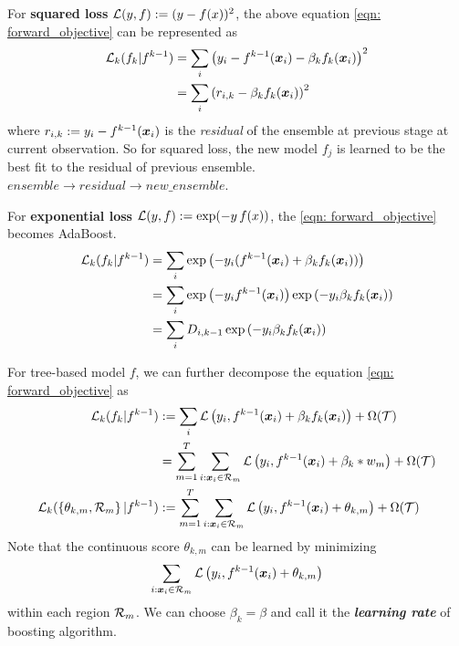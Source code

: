 \documentclass[11pt]{article}
\begin{document}
For \textbf{squared loss} ${\mathcal L}(y,f) := (y-f(x))^2$, the above equation \eqref{eqn: forward_objective} can be represented as 
\begin{align*}
{\mathcal L}_{k}(f_{k} | f^{k-1}) &= \sum_{i}\left(y_i - f^{k-1}(\boldsymbol{x}_{i}) - \beta_{k} f_{k}(\boldsymbol{x}_{i})\right)^2 \\
&=  \sum_{i}\left(r_{i,k} - \beta_{k} f_{k}(\boldsymbol{x}_{i})\right)^2 
\end{align*} where $r_{i,k}:= y_i - f^{k-1}(\boldsymbol{x}_{i})$ is the \emph{residual} of the ensemble at previous stage at current observation. So for squared loss, the new model $f_{j}$ is learned to be the best fit to the residual of previous ensemble. $ensemble \rightarrow residual \rightarrow new\_ensemble$.

For \textbf{exponential loss} ${\mathcal L}(y,f) := \exp(-y\,f(x))$, the \eqref{eqn: forward_objective} becomes AdaBoost. 
\begin{align*}
{\mathcal L}_{k}(f_{k} | f^{k-1}) &= \sum_{i}\exp\left(-y_i (f^{k-1}(\boldsymbol{x}_{i}) + \beta_{k} f_{k}(\boldsymbol{x}_{i}))\right) \\
&=  \sum_{i}\exp\left(-y_i f^{k-1}(\boldsymbol{x}_{i})\right) \exp\left( -y_{i}\beta_{k} f_{k}(\boldsymbol{x}_{i})\right) \\
&=  \sum_{i}D_{i,k-1} \exp\left( -y_{i}\beta_{k} f_{k}(\boldsymbol{x}_{i})\right)
\end{align*}

For tree-based model $f$, we can further decompose the equation \eqref{eqn: forward_objective} as 
\begin{align}
{\mathcal L}_{k}(f_{k} | f^{k-1}) &:=  \sum_{i}{\mathcal L}\left(y_i, f^{k-1}(\boldsymbol{x}_{i}) +\beta_{k} f_{k}(\boldsymbol{x}_{i})\right) + \Omega({\mathcal T}) \nonumber\\
&=  \sum_{m=1}^{T}\sum_{i: \boldsymbol{x}_{i} \in {\mathcal R}_{m}}{\mathcal L}\left(y_i, f^{k-1}(\boldsymbol{x}_{i}) +\beta_{k}*w_{m} \right) + \Omega({\mathcal T}) \nonumber\\
{\mathcal L}_{k}(\left\{\theta_{k,m}, {\mathcal R}_{m}\right\} | f^{k-1})&:=  \sum_{m=1}^{T}\sum_{i: \boldsymbol{x}_{i} \in {\mathcal R}_{m}}{\mathcal L}\left(y_i, f^{k-1}(\boldsymbol{x}_{i}) +\theta_{k,m} \right) + \Omega({\mathcal T}) \label{eqn: forward_objective_tree}
\end{align} Note that the continuous score $\theta_{k,m}$ can be learned by minimizing $$\sum_{i: \boldsymbol{x}_{i} \in {\mathcal R}_{m}}{\mathcal L}\left(y_i, f^{k-1}(\boldsymbol{x}_{i}) +\theta_{k,m} \right)$$ within each region ${\mathcal R}_{m}$. We can choose $\beta_{k} = \beta$ and call it the \textbf{\emph{learning rate}} of boosting algorithm.
\end{document}
